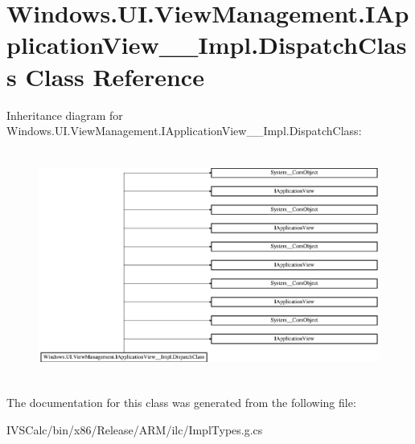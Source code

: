 \hypertarget{class_windows_1_1_u_i_1_1_view_management_1_1_i_application_view_____impl_1_1_dispatch_class}{}\section{Windows.\+U\+I.\+View\+Management.\+I\+Application\+View\+\_\+\+\_\+\+Impl.\+Dispatch\+Class Class Reference}
\label{class_windows_1_1_u_i_1_1_view_management_1_1_i_application_view_____impl_1_1_dispatch_class}
Inheritance diagram for Windows.\+U\+I.\+View\+Management.\+I\+Application\+View\+\_\+\+\_\+\+Impl.\+Dispatch\+Class\+:\begin{figure}[H]
\begin{center}
\leavevmode
\includegraphics[height=7.567567cm]{class_windows_1_1_u_i_1_1_view_management_1_1_i_application_view_____impl_1_1_dispatch_class}
\end{center}
\end{figure}


The documentation for this class was generated from the following file\+:\begin{DoxyCompactItemize}
\item 
I\+V\+S\+Calc/bin/x86/\+Release/\+A\+R\+M/ilc/Impl\+Types.\+g.\+cs\end{DoxyCompactItemize}
